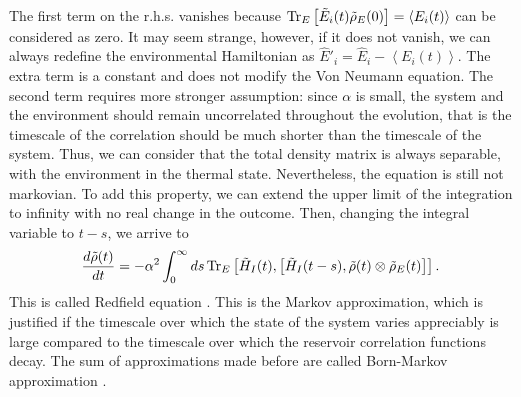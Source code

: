 The first term on the r.h.s. vanishes because $ \operatorname{Tr}_E\left[\tilde E_i(t)\tilde\rho_E(0)\right] = \left<E_i(t)\right>$ can be considered as zero. 
It may seem strange, however, if it does not vanish, we can always redefine the environmental Hamiltonian as $\hat E'_i = \hat E_i - \left<E_i(t)\right>$. The extra term is a constant and does not modify the Von Neumann equation.
The second term requires more stronger assumption: since $\alpha$ is small, the system and the environment should remain uncorrelated throughout the evolution, that is the timescale of the correlation should be much shorter than the timescale of the system. Thus, we can consider that the total density matrix is always separable, with the environment in the thermal state.
Nevertheless, the equation is still not markovian. To add this property, we can extend the upper limit of the integration to infinity with no real change in the outcome. Then, changing the integral variable to $t - s$, we arrive to 
\begin{eqnarray}\label{C_markovian}
    \frac{d\tilde \rho(t)}{dt} = -\alpha^2 \int_0^\infty ds \operatorname{Tr}_E\left[\tilde H_I(t),\left[\tilde H_I(t-s),\tilde\rho(t)\otimes\tilde\rho_E(t)\right]\right].
\end{eqnarray}
This is called Redfield equation \cite{Redfield}.
This is the Markov approximation, which is justified if the timescale over which the state of the system varies appreciably is large compared to the timescale over which the reservoir correlation functions decay. The sum of approximations made before are called Born-Markov approximation \cite{Breuer-Petruccione}.

